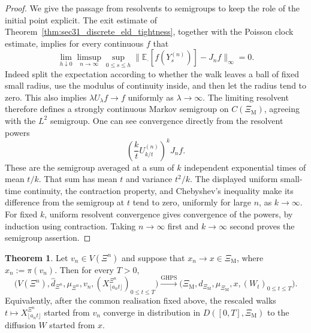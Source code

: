 \documentclass{article}
\theoremstyle{plain}
\theoremstyle{definition}
\newtheorem{theorem}{Theorem}[section]
\begin{document}
\begin{proof}
We give the passage from resolvents to semigroups to keep the role of the
initial point explicit. The exit estimate of
Theorem~\ref{thm:sec31_discrete_eld_tightness}, together with the
Poisson clock estimate, implies for every continuous $f$ that
\[
\lim_{h\downarrow0}\limsup_{n\to\infty}
\sup_{0\le s\le h}\|\mathbb E_{\cdot}[f(Y_s^{(n)})]-J_n f\|_\infty=0.
\]
Indeed split the expectation according to whether the walk leaves a ball
of fixed small radius, use the modulus of continuity inside, and then let
the radius tend to zero. This also implies
$\lambda U_\lambda f\to f$ uniformly as $\lambda\to\infty$.
The limiting resolvent therefore defines a strongly continuous Markov
semigroup on $C(\Xi_{\mathrm M})$, agreeing with the $L^2$ semigroup.
One can see convergence directly from the resolvent powers
\[
\left(\frac{k}{t}U_{k/t}^{(n)}\right)^k J_n f.
\]
These are the semigroup averaged at a sum of $k$ independent exponential
times of mean $t/k$. That sum has mean $t$ and variance $t^2/k$.
The displayed uniform small-time continuity, the contraction property,
and Chebyshev's inequality make its difference from the semigroup at
$t$ tend to zero, uniformly for large $n$, as $k\to\infty$.
For fixed $k$, uniform resolvent convergence gives convergence of the
powers, by induction using contraction. Taking $n\to\infty$ first and
$k\to\infty$ second proves the semigroup assertion.
\end{proof}
\endgroup{}

\begin{theorem}\label{thm:sec31_ghps}
Let $v_n\in V(\Xi^n)$ and suppose that $x_n\to x\in \Xi_{\mathrm M}$, where $x_n:=\pi(v_n)$.
Then for every $T>0$,
\[
\bigl(V(\Xi^n),\hat d_{\Xi^n},\mu_{\Xi^n},v_n,(X_{\lfloor a_nt\rfloor}^{\Xi^n})_{0\le t\le T}\bigr)
\overset{\mathrm{GHPS}}{\longrightarrow}
\bigl(\Xi_{\mathrm M},d_{\Xi_{\mathrm M}},\mu_{\Xi_{\mathrm M}},x,(W_t)_{0\le t\le T}\bigr).
\]
Equivalently, after the common realisation fixed above, the rescaled walks
$t\mapsto X_{\lfloor a_nt\rfloor}^{\Xi^n}$ started from $v_n$ converge in distribution in
$D([0,T],\Xi_{\mathrm M})$ to the diffusion $W$ started from $x$.
\end{theorem}
\end{document}
